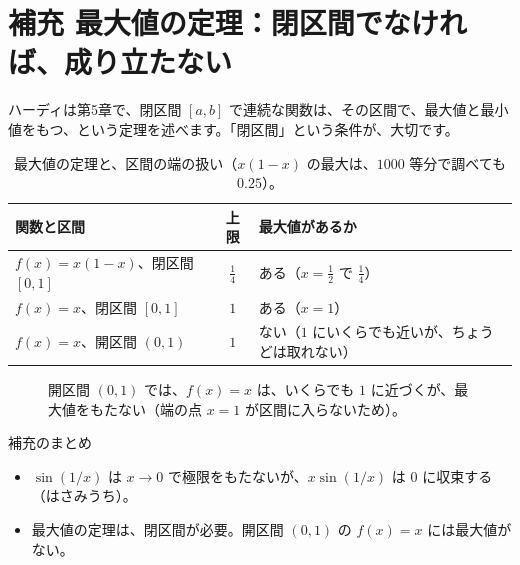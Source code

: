 \documentclass[a4paper,11pt,openany]{ltjsbook}
\begin{document}
\section{補充 最大値の定理：閉区間でなければ、成り立たない}

ハーディは第5章で、閉区間 $[a,b]$ で連続な関数は、その区間で、最大値と最小値をもつ、という定理を述べます。「閉区間」という条件が、大切です。

\begin{table}[htbp]
\centering
\begin{tabular}{lcp{6.2cm}}
\toprule
関数と区間 & 上限 & 最大値があるか\\
\midrule
$f(x)=x(1-x)$、閉区間 $[0,1]$ & $\tfrac14$ & ある（$x=\tfrac12$ で $\tfrac14$）\\
$f(x)=x$、閉区間 $[0,1]$ & $1$ & ある（$x=1$）\\
$f(x)=x$、開区間 $(0,1)$ & $1$ & ない（$1$ にいくらでも近いが、ちょうどは取れない）\\
\bottomrule
\end{tabular}
\caption{最大値の定理と、区間の端の扱い（$x(1-x)$ の最大は、$1000$ 等分で調べても $0.25$）。}
\end{table}

\begin{figure}[htbp]
\centering
{}
\caption{開区間 $(0,1)$ では、$f(x)=x$ は、いくらでも $1$ に近づくが、最大値をもたない（端の点 $x=1$ が区間に入らないため）。}
\end{figure}

\begin{pointbox}{補充のまとめ}
\begin{itemize}[leftmargin=*]
\item $\sin(1/x)$ は $x\to0$ で極限をもたないが、$x\sin(1/x)$ は $0$ に収束する（はさみうち）。
\item 最大値の定理は、閉区間が必要。開区間 $(0,1)$ の $f(x)=x$ には最大値がない。
\end{itemize}
\end{pointbox}
\end{document}
